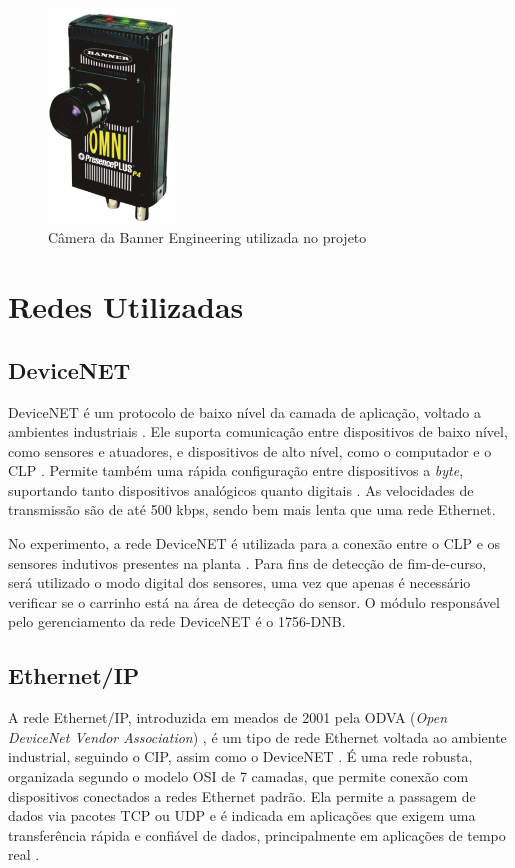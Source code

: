 \begin{figure}[!ht]
  \centering
    \includegraphics[width=0.3\textwidth]{figs/fundamentos/camera}
    \caption{Câmera da Banner Engineering utilizada no projeto \cite{redytton}\label{cameraBanner}}
\end{figure}

\section{Redes Utilizadas}
\subsection{DeviceNET}
DeviceNET é um protocolo de baixo nível da camada de aplicação, voltado a ambientes industriais \cite{dnetrta}. Ele suporta comunicação entre dispositivos de baixo nível, como sensores e atuadores, e dispositivos de alto nível, como o computador e o CLP \cite{devicenetrockwell}. Permite também uma rápida configuração entre dispositivos a \textit{byte}, suportando tanto dispositivos analógicos quanto digitais \cite{redytton}. As velocidades de transmissão são de até 500 kbps, sendo bem mais lenta que uma rede Ethernet.

No experimento, a rede DeviceNET é utilizada para a conexão entre o CLP e os sensores indutivos presentes na planta \cite{redytton}.  Para fins de detecção de fim-de-curso, será utilizado o modo digital dos sensores, uma vez que apenas é necessário verificar se o carrinho está na área de detecção do sensor. O módulo responsável pelo gerenciamento da rede DeviceNET é o 1756-DNB.

\subsection{Ethernet/IP}
A rede Ethernet/IP, introduzida em meados de 2001 pela ODVA (\textit{Open DeviceNet Vendor Association}) \cite{eipodva1}, é um tipo de rede Ethernet voltada ao ambiente industrial, seguindo o CIP, assim como o DeviceNET \cite{eiprta}. É uma rede robusta, organizada segundo o modelo OSI de 7 camadas, que permite conexão com dispositivos conectados a redes Ethernet padrão. Ela permite a passagem de dados via pacotes TCP ou UDP e é indicada em aplicações que exigem uma transferência rápida e confiável de dados, principalmente em aplicações de tempo real \cite{eiprockwell}.

